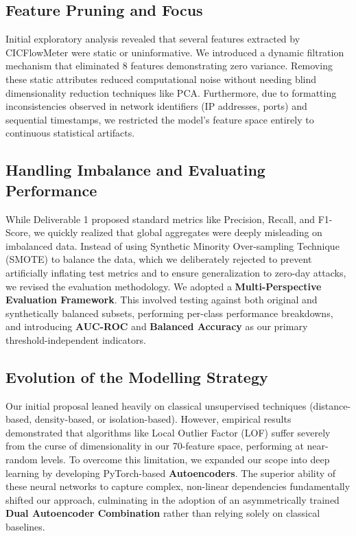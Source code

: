 \documentclass[11pt]{article}
\begin{document}
\subsection{Feature Pruning and Focus}
Initial exploratory analysis revealed that several features extracted by CICFlowMeter were static or uninformative. We introduced a dynamic filtration mechanism that eliminated 8 features demonstrating zero variance. Removing these static attributes reduced computational noise without needing blind dimensionality reduction techniques like PCA. Furthermore, due to formatting inconsistencies observed in network identifiers (IP addresses, ports) and sequential timestamps, we restricted the model's feature space entirely to continuous statistical artifacts.

\subsection{Handling Imbalance and Evaluating Performance}
While Deliverable 1 proposed standard metrics like Precision, Recall, and F1-Score, we quickly realized that global aggregates were deeply misleading on imbalanced data. Instead of using Synthetic Minority Over-sampling Technique (SMOTE) to balance the data, which we deliberately rejected to prevent artificially inflating test metrics and to ensure generalization to zero-day attacks, we revised the evaluation methodology. We adopted a \textbf{Multi-Perspective Evaluation Framework}. This involved testing against both original and synthetically balanced subsets, performing per-class performance breakdowns, and introducing \textbf{AUC-ROC} and \textbf{Balanced Accuracy} as our primary threshold-independent indicators.

\subsection{Evolution of the Modelling Strategy}
Our initial proposal leaned heavily on classical unsupervised techniques (distance-based, density-based, or isolation-based). However, empirical results demonstrated that algorithms like Local Outlier Factor (LOF) suffer severely from the curse of dimensionality in our 70-feature space, performing at near-random levels. To overcome this limitation, we expanded our scope into deep learning by developing PyTorch-based \textbf{Autoencoders}. The superior ability of these neural networks to capture complex, non-linear dependencies fundamentally shifted our approach, culminating in the adoption of an asymmetrically trained \textbf{Dual Autoencoder Combination} rather than relying solely on classical baselines.
\end{document}
